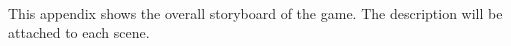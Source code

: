 \documentclass[12pt,oneside,openright,a4paper]{cpe-english-project}
\begin{document}
\nocite{*}

\makeatletter
\g@addto@macro{\UrlBreaks}{\UrlOrds}
\makeatother






 \\
This appendix shows the overall storyboard of the game. The description will be attached to each scene.
\end{document}
